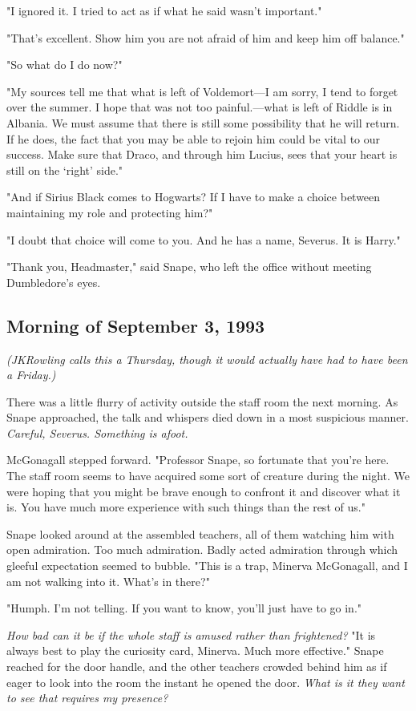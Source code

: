 "I ignored it. I tried to act as if what he said wasn't important."

"That's excellent. Show him you are not afraid of him and keep him off balance."

"So what do I do now?"

"My sources tell me that what is left of Voldemort—I am sorry, I tend to forget over the summer. I hope that was not too painful.—what is left of Riddle is in Albania. We must assume that there is still some possibility that he will return. If he does, the fact that you may be able to rejoin him could be vital to our success. Make sure that Draco, and through him Lucius, sees that your heart is still on the `right' side."

"And if Sirius Black comes to Hogwarts? If I have to make a choice between maintaining my role and protecting{\el} him?"

"I doubt that choice will come to you. And he has a name, Severus. It is Harry."

"Thank you, Headmaster," said Snape, who left the office without meeting Dumbledore's eyes.

\subsection{Morning of September 3, 1993}\emph{(JKRowling calls this a Thursday, though it would actually have had to have been a Friday.)}

There was a little flurry of activity outside the staff room the next morning. As Snape approached, the talk and whispers died down in a most suspicious manner. \emph{Careful, Severus. Something is afoot.}

McGonagall stepped forward. "Professor Snape, so fortunate that you're here. The staff room seems to have acquired some sort of creature during the night. We were hoping that you might be brave enough to confront it and discover what it is. You have much more experience with such things than the rest of us."

Snape looked around at the assembled teachers, all of them watching him with open admiration. Too much admiration. Badly acted admiration through which gleeful expectation seemed to bubble. "This is a trap, Minerva McGonagall, and I am not walking into it. What's in there?"

"Humph. I'm not telling. If you want to know, you'll just have to go in."

\emph{How bad can it be if the whole staff is amused rather than frightened?} "It is always best to play the curiosity card, Minerva. Much more effective." Snape reached for the door handle, and the other teachers crowded behind him as if eager to look into the room the instant he opened the door. \emph{What is it they want to see that requires my presence?}

